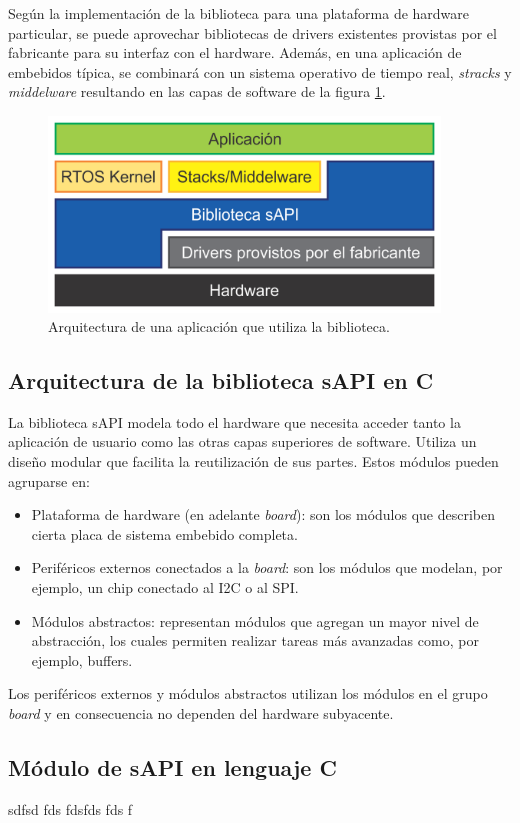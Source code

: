 Según la implementación de la biblioteca para una plataforma de hardware particular, se puede aprovechar bibliotecas de drivers existentes provistas por el fabricante para su interfaz con el hardware. Además, en una aplicación de embebidos típica, se combinará con un sistema operativo de tiempo real, \emph{stracks} y \emph{middelware} resultando en las capas de software de la figura \ref{fig:sapiCapas2}.

\begin{figure}[!htbp]
\begin{center}  %
\includegraphics*[width=10.4cm]{Figures/sapiCapas2.png}
\par\caption{Arquitectura de una aplicación que utiliza la biblioteca.}\label{fig:sapiCapas2}
\end{center}
\end{figure}

\subsection{Arquitectura de la biblioteca sAPI en C}

La biblioteca sAPI modela todo el hardware que necesita acceder tanto la aplicación de usuario como las otras capas superiores de software. Utiliza un diseño modular que facilita la reutilización de sus partes. Estos módulos pueden agruparse en:

\begin{itemize}
\item
Plataforma de hardware (en adelante \emph{board}): son los módulos que describen cierta placa de sistema embebido completa.
\item
Periféricos externos conectados a la \emph{board}: son los módulos que modelan, por ejemplo, un chip conectado al I2C o al SPI.
\item
Módulos abstractos: representan módulos que agregan un mayor nivel de abstracción, los cuales permiten realizar tareas más avanzadas como, por ejemplo, buffers.
\end{itemize}

Los periféricos externos y módulos abstractos utilizan los módulos en el grupo \emph{board} y en consecuencia no dependen del hardware subyacente.


\subsection{Módulo de sAPI en lenguaje C}

sdfsd fds fdsfds fds f